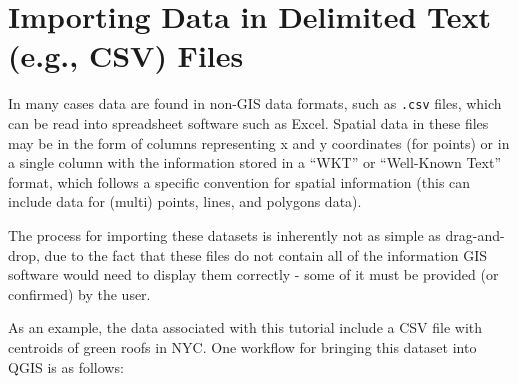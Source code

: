 \documentclass[
  letterpaper,
  DIV=11,
  numbers=noendperiod]{scrreprt}
\begin{document}
\hypertarget{importing-data-in-delimited-text-e.g.-csv-files}{%
\section{Importing Data in Delimited Text (e.g., CSV)
Files}\label{importing-data-in-delimited-text-e.g.-csv-files}}

In many cases data are found in non-GIS data formats, such as
\texttt{.csv} files, which can be read into spreadsheet software such as
Excel. Spatial data in these files may be in the form of columns
representing x and y coordinates (for points) or in a single column with
the information stored in a ``WKT'' or ``Well-Known Text'' format, which
follows a specific convention for spatial information (this can include
data for (multi) points, lines, and polygons data).

The process for importing these datasets is inherently not as simple as
drag-and-drop, due to the fact that these files do not contain all of
the information GIS software would need to display them correctly - some
of it must be provided (or confirmed) by the user.

As an example, the data associated with this tutorial include a CSV file
with centroids of green roofs in NYC. One workflow for bringing this
dataset into QGIS is as follows:
\end{document}
